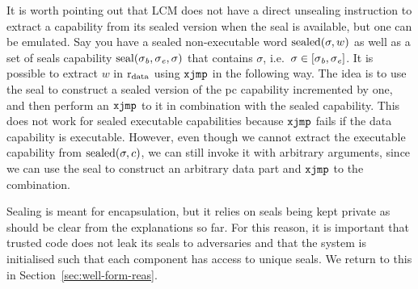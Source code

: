 \documentclass{jfp}
\newcommand{\trgcm}{\textsc{LCM}}
\newcommand{\sectionname}{Section}
\newenvironment{jversion}{}{}
\begin{document}
\begin{jversion}
  It is worth pointing out that \trgcm{} does not have a direct unsealing instruction to extract a capability from its sealed version when the seal is available, but one can be emulated.
  Say you have a sealed non-executable word $\mathrm{sealed}(\sigma,w)$ as well as a set of seals capability $\mathrm{seal}(\sigma_{\mathit{b}},\sigma_{\mathit{e}}, \sigma)$ that contains $\sigma$, i.e.\ $\sigma \in [\sigma_{\mathit{b}},\sigma_{\mathit{e}}]$.
  It is possible to extract $w$ in $\mathrm{r}_\mathrm{data}$ using $\txjmp{}{}$ in the following way.
  The idea is to use the seal to construct a sealed version of the pc capability incremented by one, and then perform an $\txjmp{}{}$ to it in combination with the sealed capability.
  This does not work for sealed executable capabilities because $\txjmp{}{}$ fails if the data capability is executable.
  However, even though we cannot extract the executable capability from $\mathrm{sealed}(\sigma,c)$, we can still invoke it with arbitrary arguments, since we can use the seal to construct an arbitrary data part and $\txjmp{}{}$ to the combination.

  Sealing is meant for encapsulation, but it relies on seals being kept private as should be clear from the explanations so far.
  For this reason, it is important that trusted code does not leak its seals to adversaries and that the system is initialised such that each component has access to unique seals.
  We return to this in \sectionname~\ref{sec:well-form-reas}.
\end{jversion}
\end{document}
